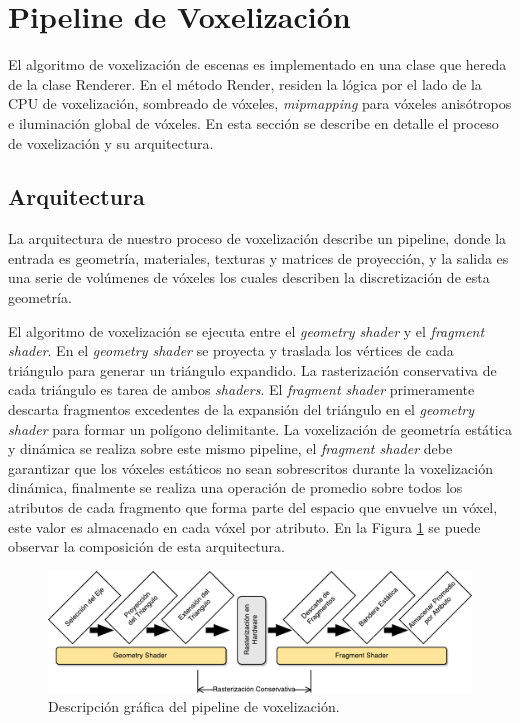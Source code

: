 \section{Pipeline de Voxelización} %
\label{sec:pipeline_de_voxelizacion}
El algoritmo de voxelización de escenas es implementado en una clase que hereda de la clase Renderer. En el método Render, residen la lógica por el lado de la CPU de voxelización, sombreado de vóxeles, \emph{mipmapping} para vóxeles anisótropos e iluminación global de vóxeles. En esta sección se describe en detalle el proceso de voxelización y su arquitectura.
\subsection{Arquitectura}

La arquitectura de nuestro proceso de voxelización describe un pipeline, donde la entrada es geometría, materiales, texturas y matrices de proyección, y la salida es una serie de volúmenes de vóxeles los cuales describen la discretización de esta geometría.

El algoritmo de voxelización se ejecuta entre el \emph{geometry shader} y el \emph{fragment shader}. En el \emph{geometry shader} se proyecta y traslada los vértices de cada triángulo para generar un triángulo expandido. La rasterización conservativa de cada triángulo es tarea de ambos \emph{shaders}. El \emph{fragment shader} primeramente descarta fragmentos excedentes de la expansión del triángulo en el \emph{geometry shader} para formar un polígono delimitante. La voxelización de geometría estática y dinámica se realiza sobre este mismo pipeline, el \emph{fragment shader} debe garantizar que los vóxeles estáticos no sean sobrescritos durante la voxelización dinámica, finalmente se realiza una operación de promedio sobre todos los atributos de cada fragmento que forma parte del espacio que envuelve un vóxel, este valor es almacenado en cada vóxel por atributo. En la Figura \ref{fig:voxel_pipeline_impl} se puede observar la composición de esta arquitectura.
\begin{figure}[H]
    \centering
    \includegraphics[width=\linewidth]{media/voxel_pipeline_cropped.pdf}
    \caption{Descripción gráfica del pipeline de voxelización.}
    \label{fig:voxel_pipeline_impl}
\end{figure}

